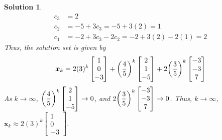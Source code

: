 \documentclass[11pt]{scrartcl}
\theoremstyle{dotlessP}
\newtheorem{sol}{Solution}[section]
\theoremstyle{dotlessN}
\DeclarePairedDelimiter\paren{(}{)} %
\begin{document}
\begin{sol}
\begin{align*}
		c_3 &= 2 \\
		c_2 &= -5 + 3c_3 = -5 + 3(2) = 1 \\
		c_1 &= -2 +3c_3 - 2c_2 = -2 + 3(2) - 2(1) = 2
	\end{align*}
	Thus, the solution set is given by 
	\[
		\bm{x}_{k} = 2(3)^k
		\begin{bmatrix}
			1 \\
			0 \\
			-3
		\end{bmatrix} +
		\paren*{
			\frac{4}{5}
		}^k
		\begin{bmatrix}
			2 \\
			1 \\
			-5
		\end{bmatrix} +
		2
		\paren*{
			\frac{3}{5}
		}^k
		\begin{bmatrix}
			-3 \\
			-3 \\
			7
		\end{bmatrix}
	\] 
	As $k \to \infty$, $\paren*{\displaystyle\frac{4}{5}}^k
\begin{bmatrix}
	2 \\
	1 \\
	-5
\end{bmatrix} \to 0
	$, and $
	2\paren*{
	\displaystyle	\frac{3}{5}
	}^k
	\begin{bmatrix}
		-3 \\
		-3 \\
		7
	\end{bmatrix} \to 0
	$. Thus, $k \to \infty$,  $
	\bm{x}_k \approx 2(3)^k
	\begin{bmatrix}
		1 \\
		0 \\
		-3
	\end{bmatrix}
	$.
\end{sol}
\end{document}
